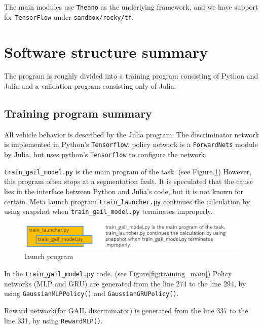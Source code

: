 The main modules use {\tt Theano} as the underlying framework, and we have support for {\tt TensorFlow} under {\tt sandbox/rocky/tf}.


\section{Software structure summary}

The program is roughly divided into a training program consisting of Python and Julia and a validation program consisting only of Julia.



\subsection{Training program summary}

All vehicle behavior is described by the Julia program. The discriminator network is implemented in Python's {\tt Tensorflow}.
policy network is a {\tt ForwardNets} module by Julia, but uses python's {\tt Tensorflow} to configure the network.


{\tt train\_gail\_model.py} is the main program of the task. (see Figure.\ref{fig:training_launch})
However, this program often stops at a segmentation fault. It is speculated that the cause lies in the interface between Python and Julia's code, but it is not known for certain.
Meta launch program {\tt train\_launcher.py} continues the calculation by using snapshot when {\tt train\_gail\_model.py} terminates improperly.




\begin{figure}[H]
\begin{center}
\includegraphics[width=16cm]{./figures/training_launch_program.png}
\caption{launch program}
\label{fig:training_launch}
\end{center}
\end{figure}

In the {\tt train\_gail\_model.py} code. (see Figure\ref{fig:training_main})
Policy networks (MLP and GRU) are generated from the line 274 to the line 294, 
by using {\tt GaussianMLPPolicy()} and {\tt GaussianGRUPolicy()}.

Reward network(for GAIL discriminator) is generated from the line 337 to the line 331, by using {\tt RewardMLP()}.




